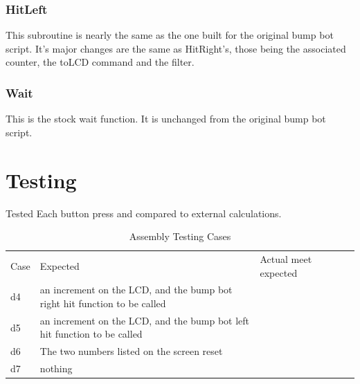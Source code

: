 \documentclass[12pt,letterpaper]{article}
\begin{document}
	
	\subsubsection{HitLeft}
	This subroutine is nearly the same as the one built for the original bump bot script. It's major changes are the same as HitRight's, those being the associated counter, the toLCD command and the filter.
	
	\subsubsection{Wait}
	This is the stock wait function. It is unchanged from the original bump bot script.
	

\section{Testing}
Tested Each button press and compared to external calculations.
\begin{table}[h]
	\centering
	\begin{tabular}{|l|l|l|ll}
		\cline{1-3}
		Case & Expected & Actual meet expected &  &  \\ \cline{1-3}
	d4	&an increment on the LCD, and the bump bot right hit function to be called&	\checkmark  &  \\ \cline{1-3}
	d5	&an increment on the LCD, and the bump bot left hit function to be called&	\checkmark	&  \\ \cline{1-3}
	d6	&The two numbers listed on the screen reset&	\checkmark  &  \\ \cline{1-3}
	d7	&nothing&	\checkmark	&  \\ \cline{1-3}
	
	\end{tabular}
\caption{Assembly Testing Cases}
\end{table}
\end{document}
